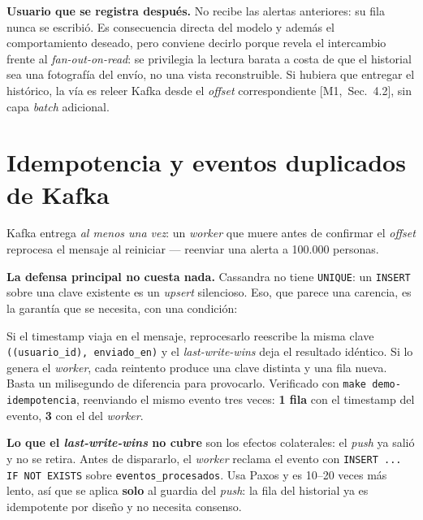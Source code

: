 \documentclass[11pt,a4paper]{article}
\newcommand{\mI}[1]{\textcolor{acento}{\small[M1,~Sec.~#1]}}
\begin{document}
\smallskip
\noindent\textbf{Usuario que se registra después.} No recibe las alertas
anteriores: su fila nunca se escribió. Es consecuencia directa del modelo y además
el comportamiento deseado, pero conviene decirlo porque revela el intercambio
frente al \emph{fan-out-on-read}: se privilegia la lectura barata a costa de que el
historial sea una fotografía del envío, no una vista reconstruible. Si hubiera que
entregar el histórico, la vía es releer Kafka desde el \emph{offset}
correspondiente \mI{4.2}, sin capa \emph{batch} adicional.

\section{Idempotencia y eventos duplicados de Kafka}
Kafka entrega \emph{al menos una vez}: un \emph{worker} que muere antes de
confirmar el \emph{offset} reprocesa el mensaje al reiniciar — reenviar una alerta
a 100.000 personas.

\textbf{La defensa principal no cuesta nada.} Cassandra no tiene \texttt{UNIQUE}: un
\texttt{INSERT} sobre una clave existente es un \emph{upsert} silencioso. Eso, que
parece una carencia, es la garantía que se necesita, con una condición:

\begin{center}
\end{center}

\noindent Si el timestamp viaja en el mensaje, reprocesarlo reescribe la misma clave
\texttt{((usuario\_id), enviado\_en)} y el \emph{last-write-wins} deja el resultado
idéntico. Si lo genera el \emph{worker}, cada reintento produce una clave distinta
y una fila nueva. Basta un milisegundo de diferencia para provocarlo. Verificado con
\texttt{make demo-idempotencia}, reenviando el mismo evento tres veces:
\textbf{1 fila} con el timestamp del evento, \textbf{3} con el del \emph{worker}.

\smallskip
\noindent\textbf{Lo que el \emph{last-write-wins} no cubre} son los efectos
colaterales: el \emph{push} ya salió y no se retira. Antes de dispararlo, el
\emph{worker} reclama el evento con \texttt{INSERT ... IF NOT EXISTS} sobre
\texttt{eventos\_procesados}. Usa Paxos y es 10--20 veces más lento, así que se
aplica \textbf{solo} al guardia del \emph{push}: la fila del historial ya es
idempotente por diseño y no necesita consenso.
\end{document}
